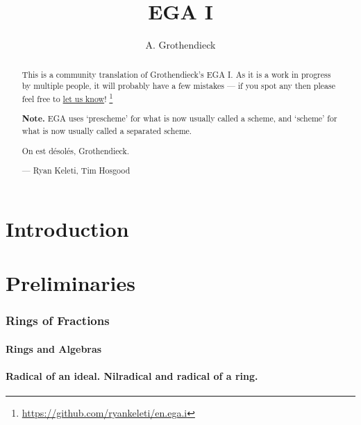 \documentclass[10pt,oneside]{amsart}
\title{EGA I}
\author{A. Grothendieck}
\begin{document}
\renewcommand{\abstractname}{What this is}
\begin{abstract}
    This is a community translation of Grothendieck's EGA I.
    As it is a work in progress by multiple people, it will probably have a few mistakes --- if you spot any then please feel free to \href{https://github.com/ryankeleti/en.ega.i/issues}{let us know}!
    \thanks{\url{https://github.com/ryankeleti/en.ega.i}}

\noindent
    \textbf{Note.} EGA uses `prescheme' for what is now usually called
    a scheme, and `scheme' for what is now usually called a
    separated scheme.
 
    On est d{\'e}sol{\'e}s, Grothendieck.

    --- Ryan Keleti, Tim Hosgood
\end{abstract}

\maketitle

\noindent\hspace{0.15\linewidth}

\tableofcontents{}


\clearpage


\part*{Introduction}



\clearpage


\setcounter{part}{-1}

\part{Preliminaries}

    \section{Rings of Fractions}
    \setcounter{subsection}{-1}

        \subsection{Rings and Algebras}
        

        \subsection{Radical of an ideal. Nilradical and radical of a ring.}
        
\end{document}
